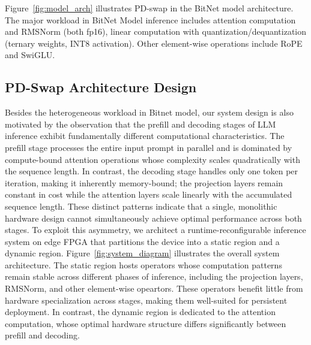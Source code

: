 \documentclass[9pt,sigconf]{acmart}
\begin{document}
Figure~\ref{fig:model_arch} illustrates PD-swap in the BitNet model architecture. The major workload in BitNet Model inference includes attention computation and RMSNorm (both fp16), linear computation with quantization/dequantization (ternary weights, INT8 activation). Other element-wise operations include RoPE and SwiGLU.


\subsection{PD-Swap Architecture Design}

Besides the heterogeneous workload in Bitnet model, our system design is also motivated by the observation that the prefill and decoding stages of LLM inference exhibit fundamentally different computational characteristics. The prefill stage processes the entire input prompt in parallel and is dominated by compute-bound attention operations whose complexity scales quadratically with the sequence length. In contrast, the decoding stage handles only one token per iteration, making it inherently memory-bound; the projection layers remain constant in cost while the attention layers scale linearly with the accumulated sequence length. These distinct patterns indicate that a single, monolithic hardware design cannot simultaneously achieve optimal performance across both stages.
To exploit this asymmetry, we architect a runtime-reconfigurable inference system on edge FPGA that partitions the device into a static region and a dynamic region. Figure~\ref{fig:system_diagram} illustrates the overall system architecture. The static region hosts operators whose computation patterns remain stable across different phases of inference, including the projection layers, RMSNorm, and other element-wise opeartors. These operators benefit little from hardware specialization across stages, making them well-suited for persistent deployment. In contrast, the dynamic region is dedicated to the attention computation, whose optimal hardware structure differs significantly between prefill and decoding. 
\end{document}
